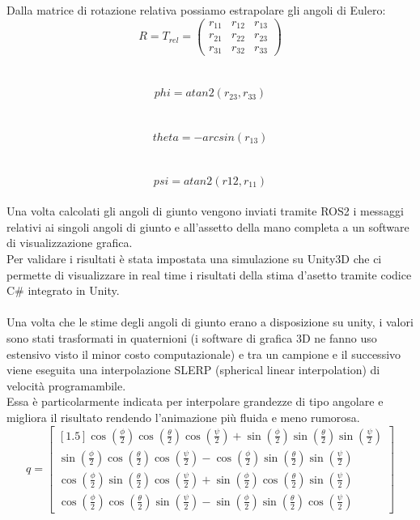 Dalla matrice di rotazione relativa possiamo estrapolare gli angoli di Eulero:
\begin{equation}
    R = T_{rel} =  \left(\begin{array}{ccc}
    r_{11}  & r_{12}  & r_{13} \\
    r_{21}  & r_{22}  & r_{23} \\
    r_{31}  & r_{32}  & r_{33} 
    \end{array}\right)
    \label{slerp}
\end{equation}\\\\
\begin{equation}
    phi = atan2(r_{23},r_{33})
\end{equation}\\\\
\begin{equation}
    theta = - arcsin(r_{13})
\end{equation}\\\\
\begin{equation}
    psi = atan2(r{12},r_{11})
\end{equation}\\

Una volta calcolati gli angoli di giunto vengono inviati tramite ROS2 i messaggi relativi ai singoli angoli di giunto e all'assetto della mano completa a un software di visualizzazione grafica. \\
Per validare i risultati è stata impostata una simulazione su Unity3D che ci permette di visualizzare in real time i risultati della stima d'asetto tramite codice C\# integrato in Unity. \\\\
Una volta che le stime degli angoli di giunto erano a disposizione su unity, i valori sono stati trasformati in quaternioni (i software di grafica 3D ne fanno uso estensivo visto il minor costo computazionale) e tra un campione e il successivo viene eseguita una interpolazione SLERP (spherical linear interpolation) di velocità programambile.\\
Essa è particolarmente indicata per interpolare grandezze di tipo angolare e migliora il risultato rendendo l'animazione più fluida e meno rumorosa.\\

\begin{equation}
    q = \begin{bmatrix}[1.5] \cos(\frac{\phi}{2})\cos(\frac{\theta}{2})\cos(\frac{\psi}{2}) + \sin(\frac{\phi}{2})\sin(\frac{\theta}{2})\sin(\frac{\psi}{2})\\ \sin(\frac{\phi}{2})\cos(\frac{\theta}{2})\cos(\frac{\psi}{2}) - \cos(\frac{\phi}{2})\sin(\frac{\theta}{2})\sin(\frac{\psi}{2})\\ \cos(\frac{\phi}{2})\sin(\frac{\theta}{2})\cos(\frac{\psi}{2}) + \sin(\frac{\phi}{2})\cos(\frac{\theta}{2})\sin(\frac{\psi}{2})\\ \cos(\frac{\phi}{2})\cos(\frac{\theta}{2})\sin(\frac{\psi}{2}) - \sin(\frac{\phi}{2})\sin(\frac{\theta}{2})\cos(\frac{\psi}{2}) \end{bmatrix}
\end{equation}

